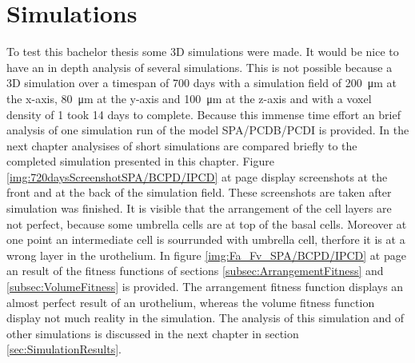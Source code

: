 \section{Simulations}
To test this bachelor thesis some 3D simulations were made. It would be nice to have an in depth analysis of several simulations. This is not possible because a 3D simulation over a timespan of 700 days with a simulation field of \SI{200}{\micro\metre} at the x-axis, \SI{80}{\micro\metre} at the y-axis and \SI{100}{\micro\metre} at the z-axis and with a voxel density of 1 took 14 days to complete. Because this immense time effort an brief analysis of one simulation run of the model SPA/PCDB/PCDI is provided. In the next chapter analysises of short simulations are compared briefly to the completed simulation presented in this chapter. \newline
Figure \ref{img:720daysScreenshotSPA/BCPD/IPCD} at page \pageref{img:720daysScreenshotSPA/BCPD/IPCD} display screenshots at the front and at the back of the simulation field. These screenshots are taken after simulation was finished. It is visible that the arrangement of the cell layers are not perfect, because some umbrella cells are at top of the basal cells. Moreover at one point an intermediate cell is sourrunded with umbrella cell, therfore it is at a wrong layer in the urothelium. \newline
In figure \ref{img:Fa_Fv_SPA/BCPD/IPCD} at page \pageref{img:Fa_Fv_SPA/BCPD/IPCD} an result of the fitness functions of sections \ref{subsec:ArrangementFitness} and \ref{subsec:VolumeFitness} is provided. The arrangement fitness function displays an almost perfect result of an urothelium, whereas the volume fitness function display not much reality in the simulation.
The analysis of this simulation and of other simulations is discussed in the next chapter in section \ref{sec:SimulationResults}.
